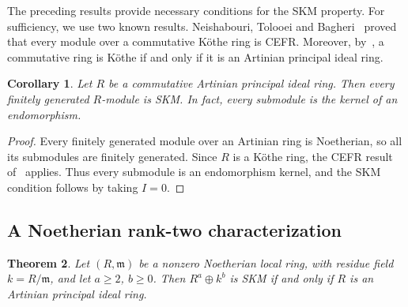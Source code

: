 \documentclass[11pt,a4paper]{article}
\newtheorem{theorem}{Theorem}[section]
\newtheorem{corollary}[theorem]{Corollary}
\theoremstyle{definition}
\theoremstyle{remark}
\begin{document}
The preceding results provide necessary conditions
for the SKM property. For sufficiency, we use
two known results. Neishabouri, Tolooei and
Bagheri~\cite{Neishabouri} proved that every
module over a commutative K\"othe ring is CEFR.
Moreover, by~\cite[Theorem~1.2]{Baghdari},
a commutative ring is K\"othe if and only if
it is an Artinian principal ideal ring.

\begin{corollary}
\label{cor:pir}
Let $R$ be a commutative Artinian principal ideal ring.
Then every finitely generated $R$-module is SKM.
In fact, every submodule is the kernel of an
endomorphism.
\end{corollary}

\begin{proof}
Every finitely generated module over an Artinian
ring is Noetherian, so all its submodules are
finitely generated. Since $R$ is a K\"othe ring,
the CEFR result of~\cite{Neishabouri} applies.
Thus every submodule is an endomorphism kernel,
and the SKM condition follows by taking $I=0$.
\end{proof}


\subsection{A Noetherian rank-two characterization}

\begin{theorem}
\label{thm:noethlocal}
Let $(R,\mathfrak m)$ be a nonzero Noetherian local ring, with residue field $k=R/\mathfrak m$, and let $a\geq2$, $b\geq0$. Then $R^a\oplus k^b$ is SKM if and only if $R$ is an Artinian principal ideal ring.
\end{theorem}
\end{document}
